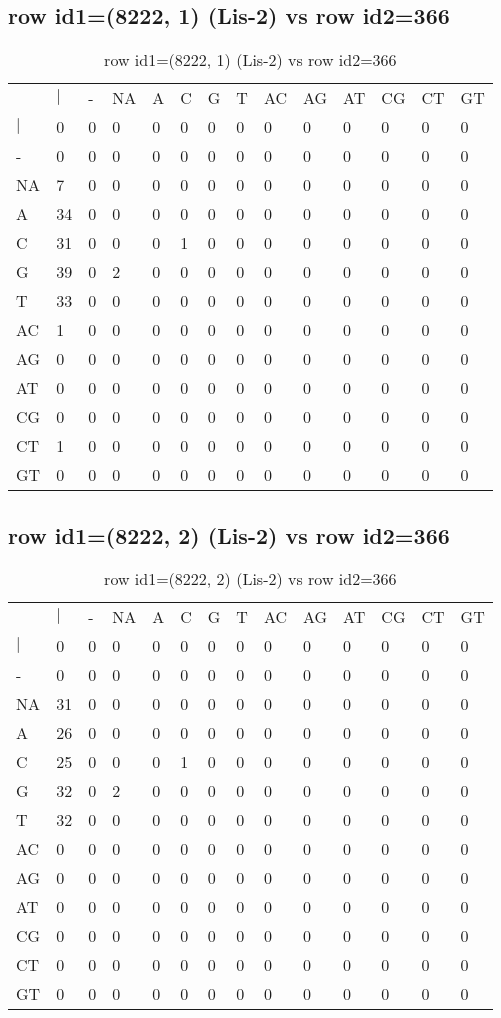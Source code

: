 \subsection{row id1=(8222, 1) (Lis-2) vs row id2=366}
\begin{center}
\begin{longtable}{|l|l|l|l|l|l|l|l|l|l|l|l|l|l|}
\caption{row id1=(8222, 1) (Lis-2) vs row id2=366} \label{table_dm350}\\
\hline
\\
\hline
&$|$&-&NA&A&C&G&T&AC&AG&AT&CG&CT&GT\\
$|$&0&0&0&0&0&0&0&0&0&0&0&0&0\\
-&0&0&0&0&0&0&0&0&0&0&0&0&0\\
NA&7&0&0&0&0&0&0&0&0&0&0&0&0\\
A&34&0&0&0&0&0&0&0&0&0&0&0&0\\
C&31&0&0&0&1&0&0&0&0&0&0&0&0\\
G&39&0&2&0&0&0&0&0&0&0&0&0&0\\
T&33&0&0&0&0&0&0&0&0&0&0&0&0\\
AC&1&0&0&0&0&0&0&0&0&0&0&0&0\\
AG&0&0&0&0&0&0&0&0&0&0&0&0&0\\
AT&0&0&0&0&0&0&0&0&0&0&0&0&0\\
CG&0&0&0&0&0&0&0&0&0&0&0&0&0\\
CT&1&0&0&0&0&0&0&0&0&0&0&0&0\\
GT&0&0&0&0&0&0&0&0&0&0&0&0&0\\
\hline
\end{longtable}
\end{center}

\subsection{row id1=(8222, 2) (Lis-2) vs row id2=366}
\begin{center}
\begin{longtable}{|l|l|l|l|l|l|l|l|l|l|l|l|l|l|}
\caption{row id1=(8222, 2) (Lis-2) vs row id2=366} \label{table_dm352}\\
\hline
\\
\hline
&$|$&-&NA&A&C&G&T&AC&AG&AT&CG&CT&GT\\
$|$&0&0&0&0&0&0&0&0&0&0&0&0&0\\
-&0&0&0&0&0&0&0&0&0&0&0&0&0\\
NA&31&0&0&0&0&0&0&0&0&0&0&0&0\\
A&26&0&0&0&0&0&0&0&0&0&0&0&0\\
C&25&0&0&0&1&0&0&0&0&0&0&0&0\\
G&32&0&2&0&0&0&0&0&0&0&0&0&0\\
T&32&0&0&0&0&0&0&0&0&0&0&0&0\\
AC&0&0&0&0&0&0&0&0&0&0&0&0&0\\
AG&0&0&0&0&0&0&0&0&0&0&0&0&0\\
AT&0&0&0&0&0&0&0&0&0&0&0&0&0\\
CG&0&0&0&0&0&0&0&0&0&0&0&0&0\\
CT&0&0&0&0&0&0&0&0&0&0&0&0&0\\
GT&0&0&0&0&0&0&0&0&0&0&0&0&0\\
\hline
\end{longtable}
\end{center}


